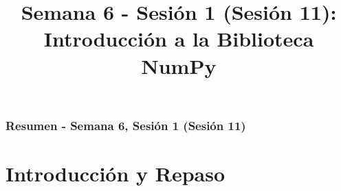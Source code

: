 \documentclass[10pt]{beamer}
\begin{document}
\myfront{}

\begin{frame}
  \titlepage
  \title{Semana 6 - Sesión 1 (Sesión 11): Introducción a la Biblioteca NumPy}
\end{frame}

\begin{frame}
  \frametitle{Resumen - Semana 6, Sesión 1 (Sesión 11)}
  \tableofcontents
\end{frame}


\section{Introducción y Repaso}
\end{document}
